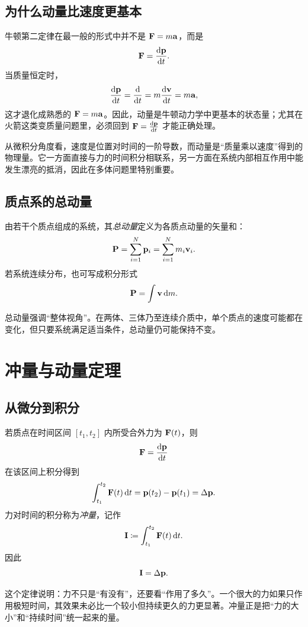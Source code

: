 \subsection{为什么动量比速度更基本}

牛顿第二定律在最一般的形式中并不是 $\vb F=m\vb a$，而是
\[
\vb F=\dv{\vb p}{t}.
\]
当质量恒定时，
\[
\dv{\vb p}{t}=\dv{}{t}(m\vb v)=m\dv{\vb v}{t}=m\vb a,
\]
这才退化成熟悉的 $\vb F=m\vb a$。因此，动量是牛顿动力学中更基本的状态量；尤其在火箭这类变质量问题里，必须回到 $\vb F=\dv{\vb p}{t}$ 才能正确处理。

\begin{remark}
从微积分角度看，速度是位置对时间的一阶导数，而动量是“质量乘以速度”得到的物理量。它一方面直接与力的时间积分相联系，另一方面在系统内部相互作用中能发生漂亮的抵消，因此在多体问题里特别重要。
\end{remark}

\subsection{质点系的总动量}

\begin{definition}
由若干个质点组成的系统，其\emph{总动量}定义为各质点动量的矢量和：
\[
\vb P=\sum_{i=1}^N \vb p_i=\sum_{i=1}^N m_i\vb v_i.
\]
若系统连续分布，也可写成积分形式
\[
\vb P=\int \vb v\,\dd m.
\]
\end{definition}

总动量强调“整体视角”。在两体、三体乃至连续介质中，单个质点的速度可能都在变化，但只要系统满足适当条件，总动量仍可能保持不变。

\section{冲量与动量定理}

\subsection{从微分到积分}

\begin{law}[动量定理]
若质点在时间区间 $[t_1,t_2]$ 内所受合外力为 $\vb F(t)$，则
\[
\vb F=\dv{\vb p}{t}
\]
在该区间上积分得到
\[
\int_{t_1}^{t_2}\vb F(t)\,\dd t=\vb p(t_2)-\vb p(t_1)=\Delta\vb p.
\]
力对时间的积分称为\emph{冲量}，记作
\[
\vb I\coloneqq \int_{t_1}^{t_2}\vb F(t)\,\dd t.
\]
因此
\[
\vb I=\Delta\vb p.
\]
\end{law}

这个定律说明：力不只是“有没有”，还要看“作用了多久”。一个很大的力如果只作用极短时间，其效果未必比一个较小但持续更久的力更显著。冲量正是把“力的大小”和“持续时间”统一起来的量。

